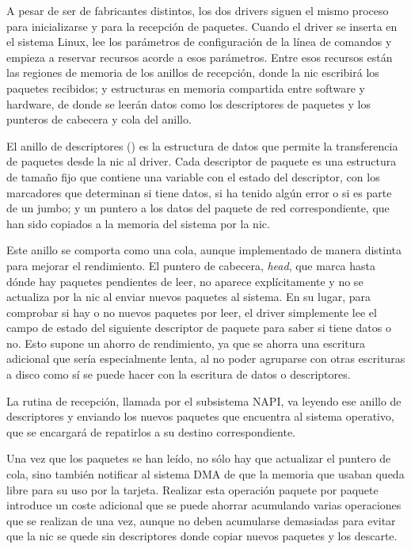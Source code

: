 \documentclass[twoside, 12pt]{epstfg}
\begin{document}
A pesar de ser de fabricantes distintos, los dos \glspl{driver} siguen el mismo proceso para inicializarse y para la recepción de paquetes. Cuando el \gls{driver} se inserta en el sistema Linux, lee los parámetros de configuración de la línea de comandos y empieza a reservar recursos acorde a esos parámetros. Entre esos recursos están las regiones de memoria de los anillos de recepción, donde la \gls{nic} escribirá los paquetes recibidos; y estructuras en memoria compartida entre software y hardware, de donde se leerán datos como los descriptores de paquetes y los punteros de cabecera y cola del anillo.

El anillo de descriptores () es la estructura de datos que permite la transferencia de paquetes desde la \gls{nic} al \gls{driver}. Cada descriptor de paquete es una estructura de tamaño fijo que contiene una variable con el estado del descriptor, con los marcadores que determinan si tiene datos, si ha tenido algún error o si es parte de un \gls{jumbo}; y un puntero a los datos del paquete de red correspondiente, que han sido copiados a la memoria del sistema por la \gls{nic}.

Este anillo se comporta como una cola, aunque implementado de manera distinta para mejorar el rendimiento. El puntero de cabecera, \textit{head}, que marca hasta dónde hay paquetes pendientes de leer, no aparece explícitamente y no se actualiza por la \gls{nic} al enviar nuevos paquetes al sistema. En su lugar, para comprobar si hay o no nuevos paquetes por leer, el \gls{driver} simplemente lee el campo de estado del siguiente descriptor de paquete para saber si tiene datos o no. Esto supone un ahorro de rendimiento, ya que se ahorra una escritura adicional que sería especialmente lenta, al no poder agruparse con otras escrituras a disco como sí se puede hacer con la escritura de datos o descriptores.

La rutina de recepción, llamada por el subsistema \gls{NAPI}, va leyendo ese anillo de descriptores y enviando los nuevos paquetes que encuentra al sistema operativo, que se encargará de repatirlos a su destino correspondiente.

Una vez que los paquetes se han leído, no sólo hay que actualizar el puntero de cola, sino también notificar al sistema \gls{DMA} de que la memoria que usaban queda libre para su uso por la tarjeta. Realizar esta operación paquete por paquete introduce un coste adicional que se puede ahorrar acumulando varias operaciones que se realizan de una vez, aunque no deben acumularse demasiadas para evitar que la \gls{nic} se quede sin descriptores donde copiar nuevos paquetes y los descarte.
\end{document}
